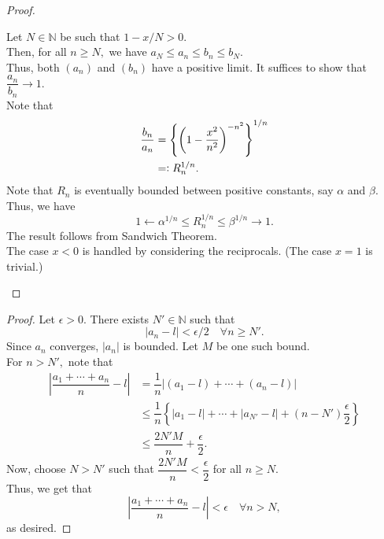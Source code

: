 \begin{proof}
\begin{enumerate}[label = (\roman*)]
		Let $N \in \mathbb{N}$ be such that $1 - x/N > 0.$ \\
		Then, for all $n \ge N,$ we have $a_N \le a_n \le b_n \le b_N.$\\
		Thus, both $(a_n)$ and $(b_n)$ have a positive limit. It suffices to show that $\dfrac{a_n}{b_n} \to 1.$\\
		Note that
		\begin{align*} 
			\dfrac{b_n}{a_n} &= \left\{\left(1 - \dfrac{x^2}{n^2}\right)^{-n^2}\right\}^{1/n}\\
			&=\vcentcolon R_n^{1/n}.
		\end{align*}
		Note that $R_n$ is eventually bounded between positive constants, say $\alpha$ and $\beta$.\\
		Thus, we have
		\begin{equation*} 
			1 \leftarrow \alpha^{1/n} \le R_n^{1/n} \le \beta^{1/n} \to 1.
		\end{equation*}
		The result follows from Sandwich Theorem.\\
		The case $x < 0$ is handled by considering the reciprocals. (The case $x = 1$ is trivial.)
	\end{enumerate}
\end{proof}

\cauchyfirst*\label{thm:cauchyfirst2}
\begin{flushright}\hyperref[thm:cauchyfirst]{\upsym}\end{flushright}
\begin{proof}
	Let $\epsilon > 0.$ There exists $N' \in \mathbb{N}$ such that
	\begin{equation*} 
		|a_n - l| < \epsilon/2 \quad \forall n \ge N'.
	\end{equation*}
	Since $a_n$ converges, $|a_n|$ is bounded. Let $M$ be one such bound.\\
	For $n > N',$ note that
	\begin{align*} 
		\left|\dfrac{a_1 + \cdots + a_n}{n} - l\right| &= \dfrac{1}{n}\left|(a_1 - l) + \cdots + (a_n - l)\right|\\
		&\le \dfrac{1}{n}\left\{|a_1 - l| + \cdots + |a_{N'} - l| + (n - N')\dfrac{\epsilon}{2}\right\}\\
		&\le \dfrac{2N'M}{n} + \dfrac{\epsilon}{2}.
	\end{align*}
	Now, choose $N > N'$ such that $\dfrac{2N'M}{n} < \dfrac{\epsilon}{2}$ for all $n \ge N.$\\
	Thus, we get that
	\begin{equation*} 
		\left|\dfrac{a_1 + \cdots + a_n}{n} - l\right| < \epsilon \quad \forall n > N,
	\end{equation*}
	as desired.
\end{proof}


